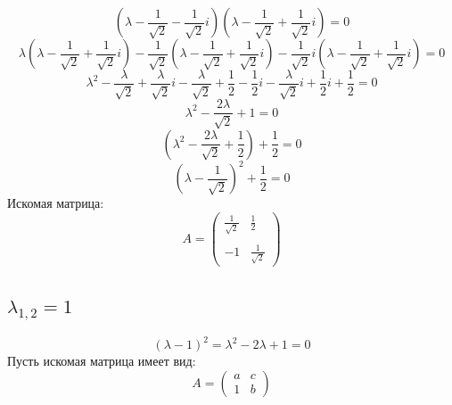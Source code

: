 \documentclass[a5paper, 10pt]{article}
\theoremstyle{definition}
\theoremstyle{plain}
\theoremstyle{remark}
\begin{document}
\begin{equation}
\left( \lambda -  \frac{1}{\sqrt{2}} - \frac{1}{\sqrt{2}} i \right) \left( \lambda -  \frac{1}{\sqrt{2}} + \frac{1}{\sqrt{2}} i  \right) = 0
\end{equation}
\begin{equation}
 \lambda\left( \lambda -  \frac{1}{\sqrt{2}} + \frac{1}{\sqrt{2}} i  \right) -  \frac{1}{\sqrt{2}}\left( \lambda -  \frac{1}{\sqrt{2}} + \frac{1}{\sqrt{2}} i  \right) - \frac{1}{\sqrt{2}} i \left( \lambda -  \frac{1}{\sqrt{2}} + \frac{1}{\sqrt{2}} i  \right) = 0
\end{equation}
\begin{equation}
\lambda^2 -  \frac{ \lambda}{\sqrt{2}} + \frac{ \lambda}{\sqrt{2}} i  -  \frac{\lambda}{\sqrt{2}} +  \frac{1}{2} - \frac{1}{2} i  - \frac{ \lambda}{\sqrt{2}} i  +  \frac{1}{2}i + \frac{1}{2}= 0
\end{equation}
\begin{equation}
\lambda^2 -  \frac{ 2 \lambda}{\sqrt{2}} + 1= 0
\end{equation}
\begin{equation}
\left( \lambda^2 -  \frac{ 2 \lambda}{\sqrt{2}} + \frac{1}{2} \right) + \frac{1}{2}= 0
\end{equation}
\begin{equation}
\left( \lambda -  \frac{ 1}{\sqrt{2}} \right)^2  + \frac{1}{2}= 0
\end{equation}
Искомая матрица:
\begin{equation}
A =
\begin{pmatrix}
 \frac{ 1}{\sqrt{2}} &  \frac{1}{2} \\
\\
-1 &  \frac{ 1}{\sqrt{2}}
\end{pmatrix}
\end{equation}



\subsection{$\lambda_{1, 2} = 1$}

\begin{equation}
\left( \lambda - 1  \right)^2 = \lambda^2 - 2\lambda + 1 = 0
\end{equation}
Пусть искомая матрица имеет вид:
\begin{equation}
A =
\begin{pmatrix}
a & c \\
1 & b
\end{pmatrix}
\end{equation}
\end{document}
